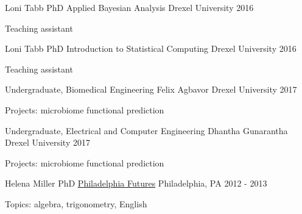 \begin{cventries}
\cventry
    {Loni Tabb PhD}
    {Applied Bayesian Analysis}
    {Drexel University}
    {2016}
    {\begin{cvitems}
        \item Teaching assistant
    \end{cvitems}}
    
\cventry
    {Loni Tabb PhD}
    {Introduction to Statistical Computing}
    {Drexel University}
    {2016}
    {\begin{cvitems}
        \item Teaching assistant
    \end{cvitems}}
    
\end{cventries}


\begin{cventries}

\cventry
    {Undergraduate, Biomedical Engineering}
    {Felix Agbavor}
    {Drexel University}
    {2017}
    {\begin{cvitems}
        \item Projects: microbiome functional prediction
    \end{cvitems}}

\cventry
    {Undergraduate, Electrical and Computer Engineering}
    {Dhantha Gunarantha}
    {Drexel University}
    {2017}
    {\begin{cvitems}
        \item Projects: microbiome functional prediction
    \end{cvitems}}
    
\end{cventries}


\begin{cventries}
    
\cventry
    {Helena Miller PhD}
    {\href{https://philadelphiafutures.org/}{Philadelphia Futures}}
    {Philadelphia, PA}
    {2012 - 2013}
    {\begin{cvitems}
        \item Topics: algebra, trigonometry, English 
    \end{cvitems}}

\end{cventries}
    




